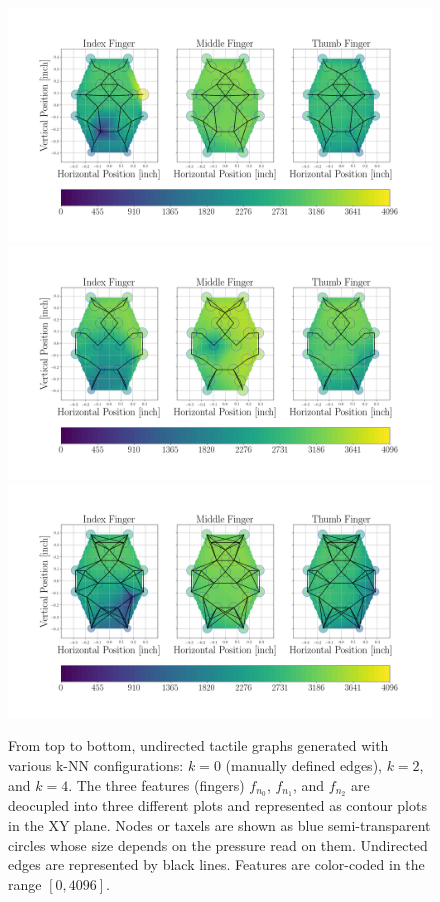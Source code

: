 \begin{figure}[!h]
    \centering
    \includegraphics[width=\linewidth, clip, trim={90 200 100 60}]{Figures/Tactile/plot-k0.png}
    \includegraphics[width=\linewidth, clip, trim={90 200 100 60}]{Figures/Tactile/plot-k2.png}
    \includegraphics[width=\linewidth, clip, trim={90 200 100 60}]{Figures/Tactile/plot-k4.png}
	\caption{From top to bottom, undirected tactile graphs generated with various \ac{k-NN} configurations: $k=0$ (manually defined edges), $k=2$, and $k=4$. The three features (fingers) $f_{n_0}$, $f_{n_1}$, and $f_{n_2}$ are deocupled into three different plots and represented as contour plots in the XY plane. Nodes or taxels are shown as blue semi-transparent circles whose size depends on the pressure read on them. Undirected edges are represented by black lines. Features are color-coded in the range $[0, 4096]$.}
	\label{fig:sample_graphs}
\end{figure}

